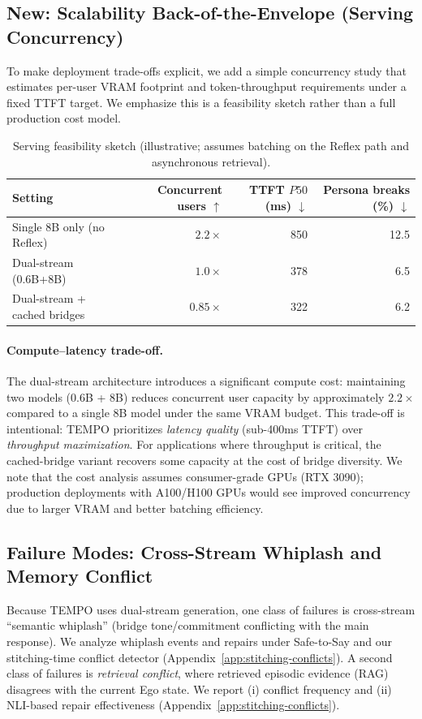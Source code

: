 \documentclass[11pt]{article}
\begin{document}
\subsection{New: Scalability Back-of-the-Envelope (Serving Concurrency)}
\label{app:scalability}
To make deployment trade-offs explicit, we add a simple concurrency study that estimates per-user VRAM footprint and token-throughput requirements under a fixed TTFT target.
We emphasize this is a feasibility sketch rather than a full production cost model.

\begin{table}[t]
  \caption{Serving feasibility sketch (illustrative; assumes batching on the Reflex path and asynchronous retrieval).}
  \label{tab:scalability-app}
  \centering
  \begin{tabular}{lrrr}
    \toprule
    Setting & Concurrent users $\uparrow$ & TTFT $P50$ (ms) $\downarrow$ & Persona breaks (\%) $\downarrow$ \\
    \midrule
    Single 8B only (no Reflex) & $2.2\times$ & 850 & 12.5 \\
    Dual-stream (0.6B+8B) & $1.0\times$ & 378 & 6.5 \\
    Dual-stream + cached bridges & $0.85\times$ & 322 & 6.2 \\
    \bottomrule
  \end{tabular}
\end{table}

\paragraph{Compute--latency trade-off.}
The dual-stream architecture introduces a significant compute cost: maintaining two models (0.6B + 8B) reduces concurrent user capacity by approximately $2.2\times$ compared to a single 8B model under the same VRAM budget.
This trade-off is intentional: TEMPO prioritizes \emph{latency quality} (sub-400ms TTFT) over \emph{throughput maximization}.
For applications where throughput is critical, the cached-bridge variant recovers some capacity at the cost of bridge diversity.
We note that the cost analysis assumes consumer-grade GPUs (RTX 3090); production deployments with A100/H100 GPUs would see improved concurrency due to larger VRAM and better batching efficiency.

\subsection{Failure Modes: Cross-Stream Whiplash and Memory Conflict}
\label{app:failure-modes}
Because TEMPO uses dual-stream generation, one class of failures is cross-stream ``semantic whiplash'' (bridge tone/commitment conflicting with the main response).
We analyze whiplash events and repairs under Safe-to-Say and our stitching-\allowbreak{}time conflict detector (Appendix~\ref{app:stitching-conflicts}).
A second class of failures is \emph{retrieval conflict}, where retrieved episodic evidence (RAG) disagrees with the current Ego state.
We report (i) conflict frequency and (ii) NLI-based repair effectiveness (Appendix~\ref{app:stitching-conflicts}).
\end{document}
